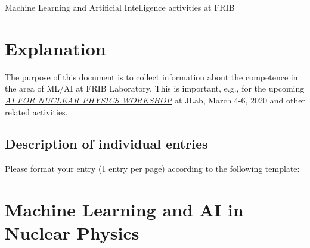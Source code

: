 \documentclass[%
10pt]{article}
\begin{document}
\thispagestyle{empty}

\begin{center}
{\LARGE\bf
\begin{spacing}{1.25}
Machine Learning and Artificial Intelligence activities at FRIB
\end{spacing}
}
\end{center}

\tableofcontents
\newpage

\section{Explanation}


The purpose of this document is to collect information about the  competence  in the area of ML/AI at FRIB Laboratory. This is important, e.g., for the upcoming \href{https://www.jlab.org/conference/AI2020}{\it AI FOR NUCLEAR PHYSICS WORKSHOP} at JLab, March 4-6, 2020 and other related  activities.


\subsection{Description of individual entries}
Please format your entry (1 entry per page) according to the following template:

\vspace{5mm}
\noindent
{}

\section{Machine Learning and AI in Nuclear Physics}
\end{document}
